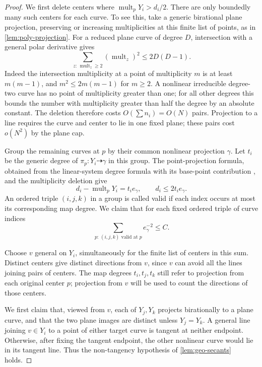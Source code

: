 \begin{proof}
We first delete centers where $\operatorname{mult}_pY_i>d_i/2$. There are only boundedly many such centers for each curve. To see this, take a generic birational plane projection, preserving or increasing multiplicities at this finite list of points, as in \cref{lem:poly-projection}. For a reduced plane curve of degree $D$, intersection with a general polar derivative gives
\begin{equation}\label{eq:geo-polar-bound}
 \sum_{z:\,\operatorname{mult}_z\ge2}
       (\operatorname{mult}_z)^2\le 2D(D-1).
\end{equation}
Indeed the intersection multiplicity at a point of multiplicity $m$ is at least $m(m-1)$, and $m^2\le2m(m-1)$ for $m\ge2$. A nonlinear irreducible degree-two curve has no point of multiplicity greater than one; for all other degrees this bounds the number with multiplicity greater than half the degree by an absolute constant. The deletion therefore costs $O(\sum n_i)=O(N)$ pairs. Projection to a line requires the curve and center to lie in one fixed plane; these pairs cost $o(N^2)$ by the plane cap.

Group the remaining curves at $p$ by their common nonlinear projection $\gamma$. Let $t_i$ be the generic degree of $\pi_p:Y_i\dashrightarrow \gamma$ in this group.  The point-projection formula, obtained from the linear-system degree formula with its base-point contribution \cite[Proposition~4.4]{Ful}, and the multiplicity deletion give
\begin{equation}\label{eq:geo-map-degree-comparison}
 d_i-\operatorname{mult}_pY_i=t_i e_\gamma,
 \qquad d_i\le2t_i e_\gamma.
\end{equation}
An ordered triple $(i,j,k)$ in a group is called valid if each index occurs at most its corresponding map degree. We claim that for each fixed ordered triple of curve indices
\begin{equation}\label{eq:geo-triple-center-bound}
 \sum_{p:\,(i,j,k)\text{ valid at }p} e_\gamma^{-2}\le C.
\end{equation}

Choose $v$ general on $Y_i$, simultaneously for the finite list of centers in this sum. Distinct centers give distinct directions from $v$, since $v$ can avoid all the lines joining pairs of centers. The map degrees $t_i,t_j,t_k$ still refer to projection from each original center $p$; projection from $v$ will be used to count the directions of those centers.

We first claim that, viewed from $v$, each of $Y_j,Y_k$ projects birationally to a plane curve, and that the two plane images are distinct unless $Y_j=Y_k$. A general line joining $v\in Y_i$ to a point of either target curve is tangent at neither endpoint. Otherwise, after fixing the tangent endpoint, the other nonlinear curve would lie in its tangent line. Thus the non-tangency hypothesis of \cref{lem:geo-secants} holds.


\end{proof}
